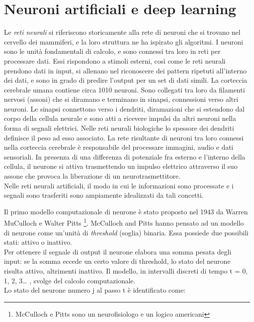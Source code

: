 \section{Neuroni artificiali e deep learning}

Le \emph{reti neurali} si riferiscono storicamente alla rete di neuroni che si trovano nel cervello dei mammiferi,
 e la loro struttura ne ha ispirato gli algoritmi. I neuroni sono le unità fondamentali di calcolo, 
 e sono connessi tra loro in reti per processare dati. Essi rispondono a stimoli esterni, così come 
 le reti neurali prendono dati in input, si allenano nel riconoscere dei pattern ripetuti all’interno 
 dei dati, e sono in grado di predire l’output per un set di dati simili. La corteccia cerebrale umana
  contiene circa 1010 neuroni. Sono collegati tra loro da filamenti nervosi (assoni) che si diramano e
   terminano in sinapsi, connessioni verso altri neuroni. Le sinapsi connettono verso i dendriti, 
   diramazioni che si estendono dal corpo della cellula neurale e sono atti a ricevere impulsi da 
   altri neuroni nella forma di segnali elettrici. Nelle reti neurali biologiche lo spessore dei 
   dendriti definisce il peso ad esso associato. La rete risultante di neuroni tra loro connessi 
   nella corteccia cerebrale è responsabile del processare immagini, audio e dati sensoriali. 
   In presenza di una differenza di potenziale fra esterno e l’interno della cellula, il neurone 
   si attiva trasmettendo un impulso elettrico attraverso il suo assone che provoca la liberazione
    di un neurotrasmettitore.\\
Nelle reti neurali artificiali, il modo in cui le informazioni sono processate e i segnali 
sono trasferiti sono ampiamente idealizzati da tali concetti. 

 Il primo modello computazionale di neurone è stato proposto nel 1943 da Warren MuCulloch
  e Walter Pitts \footnote{McCulloch e Pitts sono un neurofisiologo e un logico americani}. 
McCulloch and Pitts hanno pensato ad un modello di neurone come un’unità di \emph{threshold} (soglia) binaria.
 Essa possiede due possibili stati: attivo o inattivo.\\
  Per ottenere il segnale di output il neurone elabora una 
 somma pesata degli input: se la somma eccede un certo valore di threshold, lo stato del neurone
  risulta attivo, altrimenti inattivo.
Il modello, in intervalli discreti di tempo t = 0, 1, 2, 3… , svolge del calcolo computazionale. \\
Lo stato del neurone numero j al passo t è identificato come:

